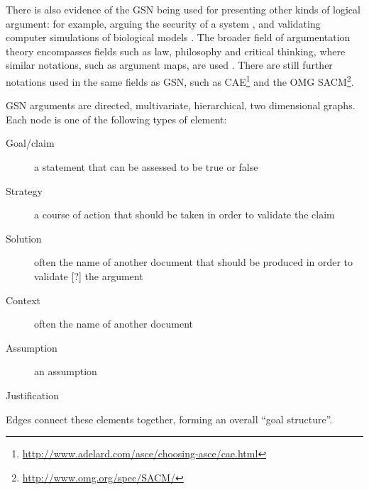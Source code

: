 There is also evidence of the GSN being used for presenting other kinds of logical argument:
for example,
arguing the security of a system \cite{plop},
and validating computer simulations of biological models \cite{insilico,royal}.
The broader field of argumentation theory encompasses fields such as law, philosophy and critical thinking, where similar notations, such as argument maps, are used \citep[pp.~3--6]{open1}.
There are still further notations used in the same fields as GSN, such as
CAE\footnote{\url{http://www.adelard.com/asce/choosing-asce/cae.html}}
and the OMG SACM\footnote{\url{http://www.omg.org/spec/SACM/}}.

GSN arguments are directed, multivariate, hierarchical, two dimensional graphs.
Each node is one of the following types of element:

\begin{description}

  \item[ Goal/claim ]
    a statement that can be assessed to be true or false

  \item[ Strategy]
    a course of action that should be taken in order to validate the claim
  
  \item[ Solution]
      often the name of another document that should be produced in order to validate [?] the argument 

  \item[ Context]
    often the name of another document

  \item[ Assumption]
    an assumption

  \item[ Justification]

\end{description}

Edges connect these elements together, forming an overall ``goal structure''. 

